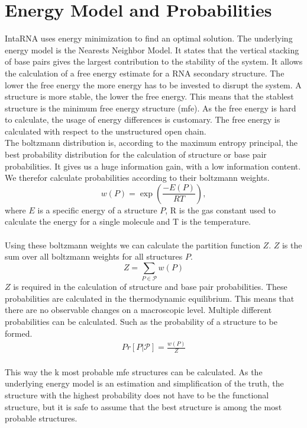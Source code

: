 \documentclass[11pt,a4paper]{report}
\newcommand{\str}{P} %
\newcommand{\ens}{\mathcal{\str}} %
\newcommand{\en}{E} %
\newcommand{\parr}{Z} %
\begin{document}
\section*{Energy Model and Probabilities}
IntaRNA uses energy minimization to find an optimal solution.
The underlying energy model is the Nearests Neighbor Model. It states that the vertical stacking of base pairs  gives the largest contribution to the stability of the system. It allows the calculation of a free energy estimate for a RNA secondary structure. The lower the free energy the more energy has to be invested to disrupt the system. A structure is more stable, the lower the free energy. This means that the stablest structure is the minimum free energy structure (mfe). As the free energy is hard to calculate, the usage of energy differences is customary. The free energy is calculated with respect to the unstructured open chain.\\
The boltzmann distribution is, according to the maximum entropy principal, the best probability distribution for the calculation of structure or base pair probabilities. It gives us a huge information gain, with a low information content. We therefor calculate probabilities according to their boltzmann weights.
\begin{equation*}
w(\str) = \exp(\frac{-\en(\str)}{RT}),
\end{equation*}
where $\en$ is a specific energy of a structure $\str$, R is the gas constant used to calculate the energy for a single molecule and T is the temperature.\\\\ %
Using these boltzmann weights we can calculate the partition function $\parr$. $\parr$ is the sum over all boltzmann weights for all structures $\str$.
\begin{equation*}
\parr = \sum\limits_{\str\in\ens} w(\str)
\end{equation*}
$\parr$ is required in the calculation of structure and base pair probabilities. These probabilities are calculated in the thermodynamic equilibrium. This means that there are no observable changes on a macroscopic level. Multiple different probabilities can be calculated. Such as the probability of a structure to be formed.\\
\begin{align*}
Pr[\str|\ens] = \frac{w(\str)}{\parr}
\end{align*}\\
This way the k most probable mfe structures can be calculated. As the underlying energy model is an estimation and simplification of the truth, the structure with the highest probability does not have to be the functional structure, but it is safe to assume that the best structure is among the most probable structures.\\
\end{document}
